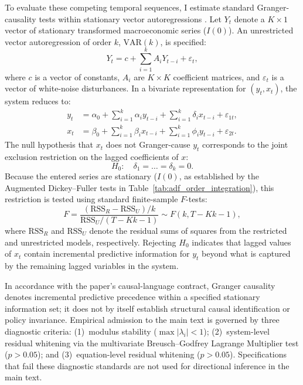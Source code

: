 To evaluate these competing temporal sequences, I estimate standard Granger-causality tests within stationary vector autoregressions \citep{Hamilton1994,Lutkepohl2005}. Let $Y_t$ denote a $K \times 1$ vector of stationary transformed macroeconomic series ($I(0)$). An unrestricted vector autoregression of order $k$, $\text{VAR}(k)$, is specified:
\begin{equation}
    Y_t = c + \sum_{i=1}^k A_i Y_{t-i} + \varepsilon_t, \label{eq:var_spec}
\end{equation}
where $c$ is a vector of constants, $A_i$ are $K \times K$ coefficient matrices, and $\varepsilon_t$ is a vector of white-noise disturbances. In a bivariate representation for $(y_t, x_t)$, the system reduces to:
\begin{align}
    y_t &= \alpha_0 + \sum_{i=1}^k \alpha_{i} y_{t-i} + \sum_{i=1}^k \delta_{i} x_{t-i} + \varepsilon_{1t}, \label{eq:granger_spec1} \\
    x_t &= \beta_0 + \sum_{i=1}^k \beta_{i} x_{t-i} + \sum_{i=1}^k \phi_{i} y_{t-i} + \varepsilon_{2t}. \label{eq:granger_spec2}
\end{align}
The null hypothesis that $x_t$ does not Granger-cause $y_t$ corresponds to the joint exclusion restriction on the lagged coefficients of $x$:
\begin{equation}
    H_0: \quad \delta_{1} = \dots = \delta_{k} = 0.
\end{equation}
Because the entered series are stationary ($I(0)$, as established by the Augmented Dickey--Fuller tests in Table~\ref{tab:adf_order_integration}), this restriction is tested using standard finite-sample $F$-tests:
\begin{equation}
    F = \frac{(\text{RSS}_R - \text{RSS}_U) / k}{\text{RSS}_U / (T - Kk - 1)} \sim F(k, T - Kk - 1),
\end{equation}
where $\text{RSS}_R$ and $\text{RSS}_U$ denote the residual sums of squares from the restricted and unrestricted models, respectively. Rejecting $H_0$ indicates that lagged values of $x_t$ contain incremental predictive information for $y_t$ beyond what is captured by the remaining lagged variables in the system. 

In accordance with the paper's causal-language contract, Granger causality denotes incremental predictive precedence within a specified stationary information set; it does not by itself establish structural causal identification or policy invariance. Empirical admission to the main text is governed by three diagnostic criteria: (1)~modulus stability ($\max |\lambda_i| < 1$); (2)~system-level residual whitening via the multivariate Breusch--Godfrey Lagrange Multiplier test ($p > 0.05$); and (3)~equation-level residual whitening ($p > 0.05$). Specifications that fail these diagnostic standards are not used for directional inference in the main text.

